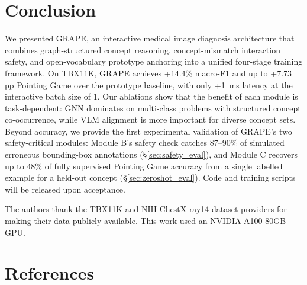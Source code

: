 \documentclass{article}
\begin{document}
\section{Conclusion}
\label{sec:conclusion}

We presented GRAPE, an interactive medical image diagnosis architecture that combines graph-structured concept reasoning, concept-mismatch interaction safety, and open-vocabulary prototype anchoring into a unified four-stage training framework.
On TBX11K, GRAPE achieves +14.4\% macro-F1 and up to +7.73 pp Pointing Game over the prototype baseline, with only +1~ms latency at the interactive batch size of 1.
Our ablations show that the benefit of each module is task-dependent: GNN dominates on multi-class problems with structured concept co-occurrence, while VLM alignment is more important for diverse concept sets.
Beyond accuracy, we provide the first experimental validation of GRAPE's two safety-critical modules: Module B's safety check catches 87--90\% of simulated erroneous bounding-box annotations (§\ref{sec:safety_eval}), and Module C recovers up to 48\% of fully supervised Pointing Game accuracy from a single labelled example for a held-out concept (§\ref{sec:zeroshot_eval}).
Code and training scripts will be released upon acceptance.

\begin{ack}
The authors thank the TBX11K and NIH ChestX-ray14 dataset providers for making their data publicly available.
This work used an NVIDIA A100 80GB GPU.
\end{ack}

\section*{References}
\end{document}
